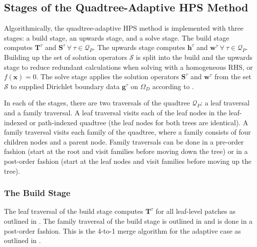 \subsection{Stages of the Quadtree-Adaptive HPS Method}
\label{sub:stages-of-the-quadtree-adaptive-hps-method}

Algorithmically, the quadtree-adaptive HPS method is implemented with three stages: a build stage, an upwards stage, and a solve stage. The build stage computes $\textbf{T}^{\tau}$ and $\textbf{S}^{\tau}\ \forall\ \tau \in \mathcal{Q}_P$. The upwards stage computes $\textbf{h}^{\tau}$ and $\textbf{w}^{\tau}\ \forall\ \tau \in \mathcal{Q}_P$. Building up the set of solution operators $\mathcal{S}$ is split into the build and the upwards stage to reduce redundant calculations when solving  with a homogeneous RHS, or $f(\textbf{x}) = 0$. The solve stage applies the solution operators $\textbf{S}^{\tau}$ and $\textbf{w}^{\tau}$ from the set $\mathcal{S}$ to supplied  Dirichlet boundary data $\textbf{g}^{\tau}$ on $\Omega_D$  according to .

In each of the stages, there are two traversals of the quadtree $\mathcal{Q}_P$: a leaf traversal and a family traversal. A leaf traversal visits each of the leaf nodes in the leaf-indexed or path-indexed quadtree (the leaf nodes for both trees are identical). A family traversal visits each family of the quadtree, where a family consists of four children nodes and a parent node. Family traversals can be done in a pre-order fashion (start at the root and visit families before moving down the tree) or in a post-order fashion (start at the leaf nodes and visit families before moving up the tree).

\subsubsection{The Build Stage}

The leaf traversal of the build stage computes $\textbf{T}^{\tau}$ for all leaf-level patches as outlined in . The family traversal of the build stage is outlined in  and is done in a post-order fashion. This is the 4-to-1 merge algorithm for the adaptive case as outlined in .

